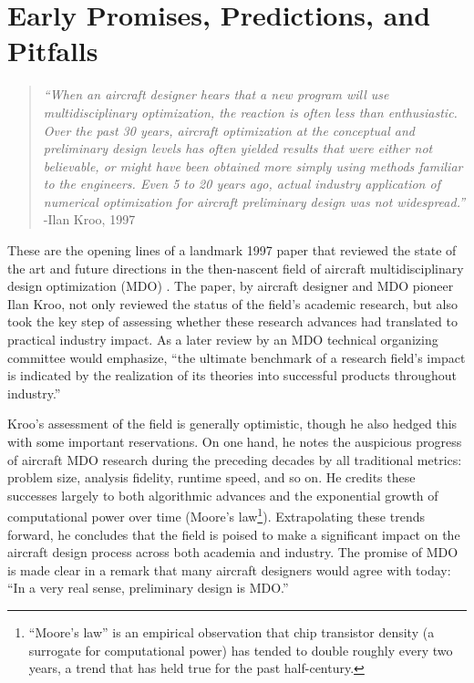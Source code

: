 \documentclass[12pt,vi,oneside,table]{report}
\begin{document}
    \section{Early Promises, Predictions, and Pitfalls}

    \begin{quote}
        \textit{``When an aircraft designer hears that a new program will use multidisciplinary optimization, the reaction is often less than enthusiastic. Over the past 30 years, aircraft optimization at the conceptual and preliminary design levels has often yielded results that were either not believable, or might have been obtained more simply using methods familiar to the engineers. Even 5 to 20 years ago, actual industry application of numerical optimization for aircraft preliminary design was not widespread.''}
        \flushright-Ilan Kroo, 1997 \cite{kroo_multidisciplinary_1997}
    \end{quote}

    These are the opening lines of a landmark 1997 paper that reviewed the state of the art and future directions in the then-nascent field of aircraft multidisciplinary design optimization (MDO) \cite{kroo_multidisciplinary_1997}. The paper, by aircraft designer and MDO pioneer Ilan Kroo, not only reviewed the status of the field's academic research, but also took the key step of assessing whether these research advances had translated to practical industry impact. As a later review by an MDO technical organizing committee would emphasize, ``the ultimate benchmark of a research field's impact is indicated by the realization of its theories into successful products throughout industry.'' \cite{agte_mdo_2010}

    Kroo's assessment of the field is generally optimistic, though he also hedged this with some important reservations. On one hand, he notes the auspicious progress of aircraft MDO research during the preceding decades by all traditional metrics: problem size, analysis fidelity, runtime speed, and so on. He credits these successes largely to both algorithmic advances and the exponential growth of computational power over time (Moore's law\footnote{``Moore's law'' is an empirical observation that chip transistor density (a surrogate for computational power) has tended to double roughly every two years, a trend that has held true for the past half-century.}). Extrapolating these trends forward, he concludes that the field is poised to make a significant impact on the aircraft design process across both academia and industry. The promise of MDO is made clear in a remark that many aircraft designers would agree with today: ``In a very real sense, preliminary design is MDO.'' \cite{kroo_multidisciplinary_1997}
\end{document}
